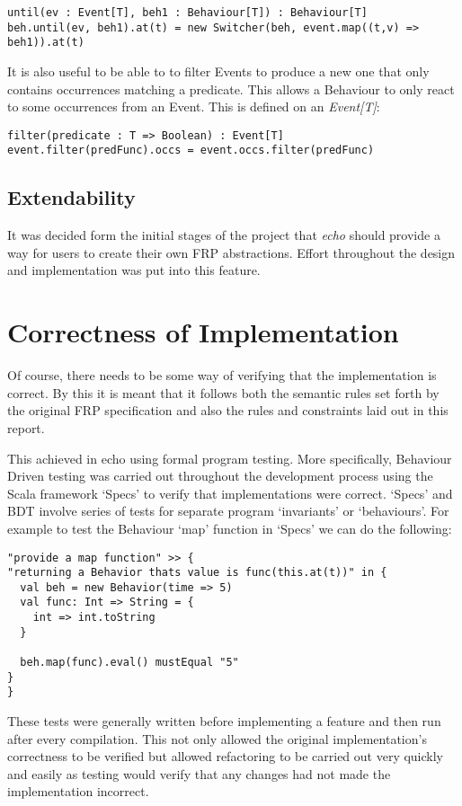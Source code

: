 \begin{verbatim}
until(ev : Event[T], beh1 : Behaviour[T]) : Behaviour[T]
beh.until(ev, beh1).at(t) = new Switcher(beh, event.map((t,v) => beh1)).at(t)
\end{verbatim}        
      
      It is also useful to be able to to filter Events to produce a new one that only
      contains occurrences matching a predicate. This allows a Behaviour to only react
      to some occurrences from an Event. This is defined on an \emph{Event[T]}:

\begin{verbatim}
filter(predicate : T => Boolean) : Event[T]
event.filter(predFunc).occs = event.occs.filter(predFunc)
\end{verbatim}        
      
    \subsection{Extendability}
      It was decided form the initial stages of the project that \emph{echo} should provide
      a way for users to create their own FRP abstractions. Effort throughout the design and
      implementation was put into this feature.
      
  
  \section{Correctness of Implementation}
    Of course, there needs to be some way of verifying that the implementation is correct. By
    this it is meant that it follows both the semantic rules set forth by the original FRP specification
    and also the rules and constraints laid out in this report.
    
    This achieved in echo using formal program testing. More specifically, Behaviour Driven
    testing was carried out throughout the development process using the Scala framework `Specs'
    to verify that implementations were correct. `Specs' and BDT involve series of tests for
    separate program `invariants' or `behaviours'. For example to test the Behaviour `map' function
    in `Specs' we can do the following:

\begin{verbatim}
"provide a map function" >> {
"returning a Behavior thats value is func(this.at(t))" in {
  val beh = new Behavior(time => 5)
  val func: Int => String = {
    int => int.toString
  }

  beh.map(func).eval() mustEqual "5"
}
}
\end{verbatim}      

  These tests were generally written before implementing a feature and then run after every compilation. 
  This not only allowed the original implementation's correctness to be verified but
  allowed refactoring to be carried out very quickly and easily as testing would verify that any changes had not
  made the implementation incorrect.